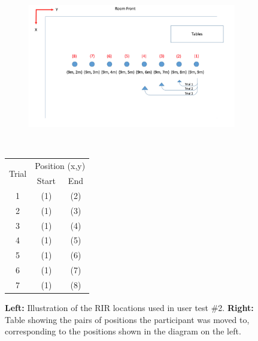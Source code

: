 \documentclass[../../main.tex]{subfiles}
\begin{document}
			\begin{figure}[H]
				\begin{minipage}{0.5\textwidth}
					\begin{figure}[H]
					\hspace{0mm}\includegraphics[scale = 0.3]{Sections/userTesting/images/test2/test2Positions2.png}
					\end{figure}			
				\end{minipage}
				~
				\begin{minipage}{0.5\textwidth}
				    \hspace{35mm}\begin{tabular}{|c|c|c|} \hline
				        \multirow{2}{*}{Trial} & \multicolumn{2}{c|}{Position (x,y)} \\ \cline{2-3}
				             & Start & End \\ \hline
				          1 & (1) & (2) \\
				          2 & (1) & (3) \\
				          3 & (1) & (4) \\
				          4 & (1) & (5) \\
				          5 & (1) & (6) \\
				          6 & (1) & (7) \\
				          7 & (1) & (8) \\ \hline
				    \end{tabular}
			    \end{minipage}
			    \caption{\textbf{Left:} Illustration of the \ac{RIR} locations used in user test \#2. \textbf{Right:} Table showing the pairs of positions the participant was moved to, corresponding to the positions shown in the diagram on the left.}
				\label{test2}
			\end{figure}
\end{document}
